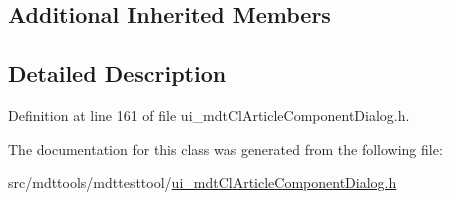 \subsection*{Additional Inherited Members}


\subsection{Detailed Description}


Definition at line 161 of file ui\-\_\-mdt\-Cl\-Article\-Component\-Dialog.\-h.



The documentation for this class was generated from the following file\-:\begin{DoxyCompactItemize}
\item 
src/mdttools/mdttesttool/\hyperlink{ui__mdt_cl_article_component_dialog_8h}{ui\-\_\-mdt\-Cl\-Article\-Component\-Dialog.\-h}\end{DoxyCompactItemize}
